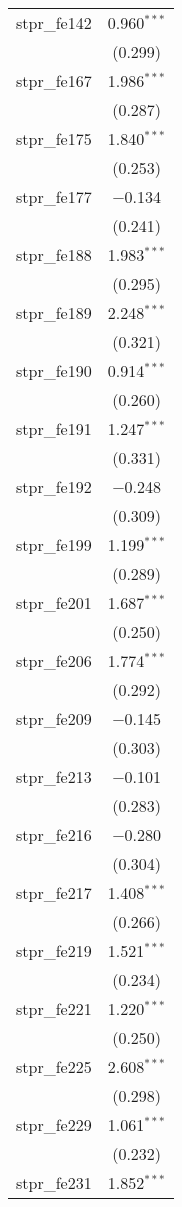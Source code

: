 \begin{table}[!htbp]
\begin{tabular}{@{\extracolsep{5pt}}lc}
  stpr\_fe142 & 0.960$^{***}$ \\ 
  & (0.299) \\ 
  stpr\_fe167 & 1.986$^{***}$ \\ 
  & (0.287) \\ 
  stpr\_fe175 & 1.840$^{***}$ \\ 
  & (0.253) \\ 
  stpr\_fe177 & $-$0.134 \\ 
  & (0.241) \\ 
  stpr\_fe188 & 1.983$^{***}$ \\ 
  & (0.295) \\ 
  stpr\_fe189 & 2.248$^{***}$ \\ 
  & (0.321) \\ 
  stpr\_fe190 & 0.914$^{***}$ \\ 
  & (0.260) \\ 
  stpr\_fe191 & 1.247$^{***}$ \\ 
  & (0.331) \\ 
  stpr\_fe192 & $-$0.248 \\ 
  & (0.309) \\ 
  stpr\_fe199 & 1.199$^{***}$ \\ 
  & (0.289) \\ 
  stpr\_fe201 & 1.687$^{***}$ \\ 
  & (0.250) \\ 
  stpr\_fe206 & 1.774$^{***}$ \\ 
  & (0.292) \\ 
  stpr\_fe209 & $-$0.145 \\ 
  & (0.303) \\ 
  stpr\_fe213 & $-$0.101 \\ 
  & (0.283) \\ 
  stpr\_fe216 & $-$0.280 \\ 
  & (0.304) \\ 
  stpr\_fe217 & 1.408$^{***}$ \\ 
  & (0.266) \\ 
  stpr\_fe219 & 1.521$^{***}$ \\ 
  & (0.234) \\ 
  stpr\_fe221 & 1.220$^{***}$ \\ 
  & (0.250) \\ 
  stpr\_fe225 & 2.608$^{***}$ \\ 
  & (0.298) \\ 
  stpr\_fe229 & 1.061$^{***}$ \\ 
  & (0.232) \\ 
  stpr\_fe231 & 1.852$^{***}$ \\ 

\end{tabular}
\end{table}
